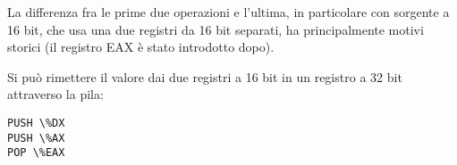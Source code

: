 \documentclass[a4paper,11pt]{article}
\begin{document}
La differenza fra le prime due operazioni e l'ultima, in particolare con sorgente a 16 bit, che usa una due registri da 16 bit separati, ha principalmente motivi storici (il registro EAX è stato introdotto dopo).

Si può rimettere il valore dai due registri a 16 bit in un registro a 32 bit attraverso la pila:
\begin{lstlisting}[language=assembler,style=codestyle]	
PUSH \%DX
PUSH \%AX
POP \%EAX
\end{lstlisting}
\end{document}
